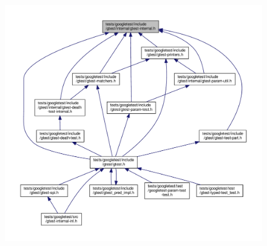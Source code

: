 \begin{figure}[H]
\begin{center}
\leavevmode
\includegraphics[width=350pt]{gtest-internal_8h__dep__incl}
\end{center}
\end{figure}
